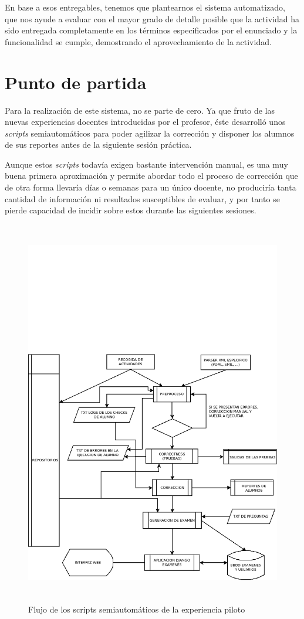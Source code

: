 En base a esos entregables, tenemos que plantearnos el sistema automatizado, que nos ayude a evaluar con el mayor grado de detalle posible que la actividad ha sido entregada completamente en los términos especificados por el enunciado y la funcionalidad se cumple, demostrando el aprovechamiento de la actividad.



\section{Punto de partida}
\label{sec:puntp_partida}


Para la realización de este sistema, no se parte de cero. Ya que fruto de las nuevas experiencias docentes introducidas por el profesor, éste desarrolló unos \textit{scripts} semiautomáticos para poder agilizar la corrección y disponer los alumnos de sus reportes antes de la siguiente sesión práctica.


Aunque estos \textit{scripts} todavía exigen bastante intervención manual, es una muy buena primera aproximación y permite abordar todo el proceso de corrección que de otra forma llevaría días o semanas para un único docente, no produciría tanta cantidad de información ni resultados susceptibles de evaluar, y por tanto se pierde capacidad de incidir sobre estos durante las siguientes sesiones.

\begin{figure}[H]
   \centering
   \includegraphics[height=17cm]{img/Diagram1_flujo_semiautomatico}
   \caption{Flujo de los scripts semiautomáticos de la experiencia piloto}
   \label{figura:flujo_semiautomatico}
\end{figure}


